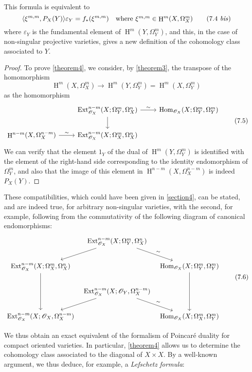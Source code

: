 \documentclass{article}
\theoremstyle{plain}
\theoremstyle{definition}
\newcommand{\sh}{\mathscr}
\DeclareMathOperator{\Ext}{Ext}
\DeclareMathOperator{\Hom}{Hom}
\DeclareMathOperator{\HH}{H}
\newcommand{\oldpage}[1]{\marginpar{\footnotesize$\Big\vert$ \textit{p.~#1}}}
\begin{document}
This formula is equivalent to
\[
\label{7.4bis}
  \langle \xi^{m,m}, P_X(Y) \rangle \varepsilon_Y
  = f_*(\xi^{m,m})
  \quad\mbox{where $\xi^{m,m}\in\HH^m(X,\Omega_X^m)$}
\tag{7.4~\emph{bis}}
\]
where $\varepsilon_Y$ is the fundamental element of $\HH^m(Y,\Omega_Y^m)$, and this, in the case of non-singular projective varieties, gives a new definition of the cohomology class associated to $Y$.

\begin{proof}
  To prove \cref{theorem4}, we consider, by \cref{theorem3}, the transpose of the homomorphism
  \[
    \HH^m(X,\Omega_X^m) \to \HH^m(Y,\Omega_Y^m) = \HH^m(X,\Omega_Y^m)
  \]
  as the homomorphism
  \[
  \label{7.5}
    \begin{tikzcd}
      &\Ext_{\sh{O}_X}^{n-m}(X;\Omega_Y^m,\Omega_X^n)
        \rar["\sim"] \dar
      &\Hom_{\sh{O}_X}(X;\Omega_Y^m,\Omega_Y^m)
    \\
      \HH^{n-m}(X,\Omega_X^{n-m})
        \rar["\sim"]
      &\Ext_{\sh{O}_X}^{n-m}(X;\Omega_X^m,\Omega_X^n)
      &
    \end{tikzcd}
  \tag{7.5}
  \]
  We can verify that the element $1_Y$ of the dual of $\HH^m(Y,\Omega_Y^m)$ is identified with the element of the right-hand side corresponding to the identity endomorphism of $\Omega_Y^m$, and also that the image of this element in $\HH^{n-m}(X,\Omega_X^{n-m})$ is indeed $P_X(Y)$.
\end{proof}

These compatibilities, which could have been given in \cref{section4}, can be stated, and are indeed true, for arbitrary non-singular varieties, with the second,
\oldpage{149-21}
for example, following from the commutativity of the following diagram of canonical endomorphisms:
\[
\label{7.6}
  \begin{tikzcd}[column sep=tiny]
    & \Ext_{\sh{O}_X}^{n-m}(X;\Omega_Y^m,\Omega_X^n)
      \ar[ld] \ar[dr,"\sim"]
    &
  \\\Ext_{\sh{O}_X}^{n-m}(X;\Omega_X^m,\Omega_X^n)
      \ar[dd]
    && \Hom_{\sh{O}_X}(X;\Omega_Y^m,\Omega_Y^m)
      \ar[dd]
  \\& \Ext_{\sh{O}_X}^{n-m}(X;\sh{O}_Y,\Omega_X^{n-m})
      \ar[ld] \ar[dr,"\sim"]
    &
  \\\Ext_{\sh{O}_X}^{n-m}(X;\sh{O}_X,\Omega_X^{n-m})
    && \Hom_{\sh{O}_X}(X;\Omega_X^m,\Omega_Y^m)
  \end{tikzcd}
\tag{7.6}
\]

We thus obtain an exact equivalent of the formalism of Poincar\'{e} duality for compact oriented varieties.
In particular, \cref{theorem4} allows us to determine the cohomology class associated to the diagonal of $X\times X$.
By a well-known argument, we thus deduce, for example, a \emph{Lefschetz formula}:
\end{document}
